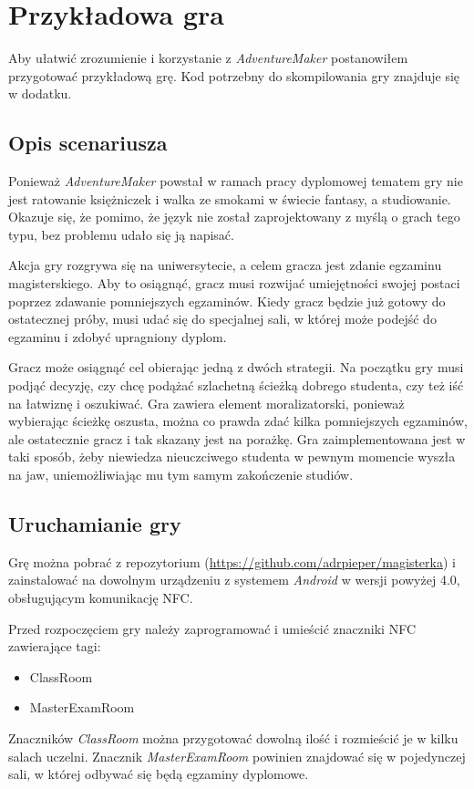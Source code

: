 \documentclass[openright]{xmgr}
\begin{document}
\chapter{Przykładowa gra}
Aby ułatwić zrozumienie i korzystanie z \textit{AdventureMaker} postanowiłem przygotować przykładową grę. Kod potrzebny do skompilowania gry znajduje się w dodatku.

\section{Opis scenariusza}

Ponieważ \textit{AdventureMaker} powstał w ramach pracy dyplomowej tematem gry nie jest ratowanie księżniczek i walka ze smokami w świecie fantasy, a studiowanie. Okazuje się, że pomimo, że język nie został zaprojektowany z myślą o grach tego typu, bez problemu udało się ją napisać.

Akcja gry rozgrywa się na uniwersytecie, a celem gracza jest zdanie egzaminu magisterskiego. Aby to osiągnąć, gracz musi rozwijać umiejętności swojej postaci poprzez zdawanie pomniejszych egzaminów. Kiedy gracz będzie już gotowy do ostatecznej próby, musi udać się do specjalnej sali, w której może podejść do egzaminu i zdobyć upragniony dyplom.

Gracz może osiągnąć cel obierając jedną z dwóch strategii. Na początku gry musi podjąć decyzję, czy chcę podążać szlachetną ścieżką dobrego studenta, czy też iść na łatwiznę i oszukiwać. Gra zawiera element moralizatorski, ponieważ wybierając ścieżkę oszusta, można co prawda zdać kilka pomniejszych egzaminów, ale ostatecznie gracz i tak skazany jest na porażkę. Gra zaimplementowana jest w taki sposób, żeby niewiedza nieuczciwego studenta w pewnym momencie wyszła na jaw, uniemożliwiając mu tym samym zakończenie studiów.

\section{Uruchamianie gry}

Grę można pobrać z repozytorium  (\url{https://github.com/adrpieper/magisterka}) i zainstalować na dowolnym urządzeniu z systemem \textit{Android} w wersji powyżej 4.0, obsługującym komunikację NFC. 

Przed rozpoczęciem gry należy zaprogramować i umieścić znaczniki NFC zawierające tagi:
\begin{itemize}
	\item ClassRoom
	\item MasterExamRoom
\end{itemize}
Znaczników \textit{ClassRoom} można przygotować dowolną ilość i rozmieścić je w kilku salach uczelni. Znacznik \textit{MasterExamRoom} powinien znajdować się w pojedynczej sali, w której odbywać się będą egzaminy dyplomowe.
\end{document}
